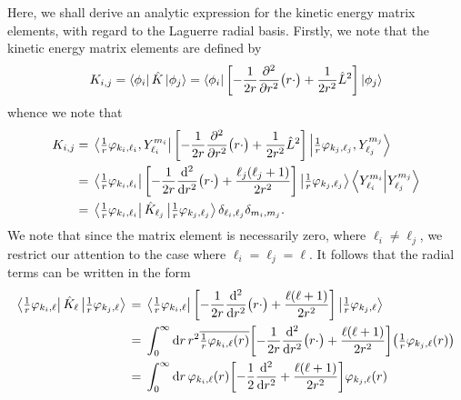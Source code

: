 \documentclass[]{article}
\begin{document}
Here, we shall derive an analytic expression for the kinetic energy matrix
elements, with regard to the Laguerre radial basis.
Firstly, we note that the kinetic energy matrix elements are defined by
\begin{equation*}
  K_{i, j}
  =
  \bra{\phi_{i}}
  \hat{K}
  \ket{\phi_{j}}
  =
  \bra{\phi_{i}}
  \lrsq[\bigg]
  {
    -
    \dfrac{1}{2 r}
    \pdv[2]{r}
    \lr[\big]
    {
      r
      \cdot
    }
    +
    \dfrac{1}{2 r^{2}}
    \hat{L}^{2}
  }
  \ket{\phi_{j}}
\end{equation*}
whence we note that
\begin{alignat*}{2}
  K_{i, j}
  {}={}
  &
  \bra
  {
    \tfrac{1}{r}\varphi_{k_{i}, \ell_{i}}
    ,
    Y_{\ell_{i}}^{m_{i}}
  }
  \lrsq[\bigg]
  {
    -
    \dfrac{1}{2 r}
    \pdv[2]{r}
    \lr[\big]
    {
      r
      \cdot
    }
    +
    \dfrac{1}{2 r^{2}}
    \hat{L}^{2}
  }
  \ket
  {
    \tfrac{1}{r}\varphi_{k_{j}, \ell_{j}}
    ,
    Y_{\ell_{j}}^{m_{j}}
  }
  \\
  {}={}
  &
  \bra{\tfrac{1}{r}\varphi_{k_{i}, \ell_{i}}}
  \lrsq[\bigg]
  {
    -
    \dfrac{1}{2 r}
    \dv[2]{r}
    \lr[\big]
    {
      r
      \cdot
    }
    +
    \dfrac
    {
      \ell_{j}
      \lr{\ell_{j} + 1}
    }
    {
      2
      r^{2}
    }
  }
  \ket{\tfrac{1}{r}\varphi_{k_{j}, \ell_{j}}}
  \bra{Y_{\ell_{i}}^{m_{i}}}
  \ket{Y_{\ell_{j}}^{m_{j}}}
  \\
  {}={}
  &
  \bra{\tfrac{1}{r}\varphi_{k_{i}, \ell_{i}}}
  \hat{K}_{\ell_{j}}
  \ket{\tfrac{1}{r}\varphi_{k_{j}, \ell_{j}}}
  \delta_{\ell_{i}, \ell_{j}}
  \delta_{m_{i}, m_{j}}
  .
\end{alignat*}
We note that since the matrix element is necessarily zero, where
$\ell_{i} \neq \ell_{j}$, we restrict our attention to the case where
$\ell_{i} = \ell_{j} = \ell$.
It follows that the radial terms can be written in the form
\begin{alignat*}{2}
  \bra{\tfrac{1}{r}\varphi_{k_{i}, \ell}}
  \hat{K}_{\ell}
  \ket{\tfrac{1}{r}\varphi_{k_{j}, \ell}}
  {}={}
  &
  \bra{\tfrac{1}{r}\varphi_{k_{i}, \ell}}
  \lrsq[\bigg]
  {
    -
    \dfrac{1}{2 r}
    \dv[2]{r}
    \lr[\big]
    {
      r
      \cdot
    }
    +
    \dfrac
    {
      \ell
      \lr{\ell + 1}
    }
    {
      2
      r^{2}
    }
  }
  \ket{\tfrac{1}{r}\varphi_{k_{j}, \ell}}
  \\
  {}={}
  &
  \int_{0}^{\infty}
  \dd{r}
  {
    r^{2}
    \overline
    {
      \tfrac{1}{r}
      \varphi_{k_{i}, \ell}\lr{r}
    }
    \lrsq[\bigg]
    {
      -
      \dfrac{1}{2 r}
      \dv[2]{r}
      \lr[\big]
      {
        r
        \cdot
      }
      +
      \dfrac
      {
        \ell
        \lr{\ell + 1}
      }
      {
        2
        r^{2}
      }
    }
    \lr[\big]
    {
      \tfrac{1}{r}
      \varphi_{k_{j}, \ell}\lr{r}
    }
  }
  \\
  {}={}
  &
  \int_{0}^{\infty}
  \dd{r}
  {
    \varphi_{k_{i}, \ell}\lr{r}
    \lrsq[\bigg]
    {
      -
      \dfrac{1}{2}
      \dv[2]{r}
      +
      \dfrac
      {
        \ell
        \lr{\ell + 1}
      }
      {
        2
        r^{2}
      }
    }
    \varphi_{k_{j}, \ell}\lr{r}
  }
\end{alignat*}
\end{document}
